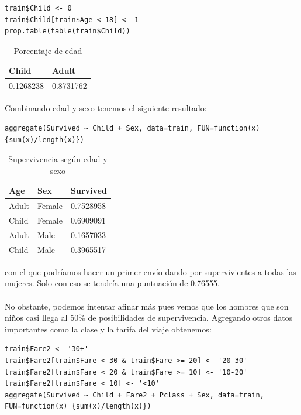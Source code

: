 \begin{lstlisting}[style=R]
train$Child <- 0
train$Child[train$Age < 18] <- 1
prop.table(table(train$Child))
\end{lstlisting}


\begin{table}[H]
	\centering
	\caption{Porcentaje de edad}
	\label{tab:child-adult}
	\begin{tabular}{|ll|}
		\hline
		Child     & Adult     \\ \hline
		0.1268238 & 0.8731762 \\ \hline
	\end{tabular}
\end{table}

Combinando edad y sexo tenemos el siguiente resultado:

\begin{lstlisting}[style=R]
aggregate(Survived ~ Child + Sex, data=train, FUN=function(x) {sum(x)/length(x)})
\end{lstlisting}

\begin{table}[H]
	\centering
	\caption{Supervivencia según edad y sexo}
	\label{tab:age-sex}
	\begin{tabular}{|ll|l|}
		\hline
		Age   & Sex    & Survived  \\ \hline
		Adult & Female & 0.7528958 \\
		Child & Female & 0.6909091 \\
		Adult & Male   & 0.1657033 \\
		Child & Male   & 0.3965517 \\ \hline
	\end{tabular}
\end{table}

con el que podríamos hacer un primer envío dando por supervivientes a todas las mujeres. Solo con eso se tendría una puntuación de 0.76555.
\\ \\
No obstante, podemos intentar afinar más pues vemos que los hombres que son niños casi llega al 50\% de posibilidades de supervivencia. Agregando otros datos importantes como la clase y la tarifa del viaje obtenemos:

\begin{lstlisting}[style=R]
train$Fare2 <- '30+'
train$Fare2[train$Fare < 30 & train$Fare >= 20] <- '20-30'
train$Fare2[train$Fare < 20 & train$Fare >= 10] <- '10-20'
train$Fare2[train$Fare < 10] <- '<10'
aggregate(Survived ~ Child + Fare2 + Pclass + Sex, data=train, FUN=function(x) {sum(x)/length(x)})
\end{lstlisting}

